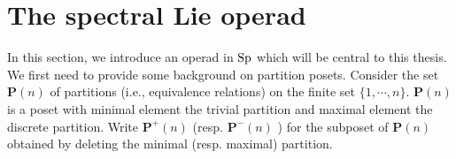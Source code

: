 %
%
%
%
\section{The spectral Lie operad}
\label{The spectral Lie operad}
In this section, we introduce an operad in $\operatorname{Sp}$ which will be central to this thesis. 
We first need to provide some background on partition posets. 
Consider the set $\mathbf{P}(n)$ of partitions (i.e., equivalence relations) on the finite set $\{1, \cdots, n \}$. $\mathbf{P}(n)$ is a poset with minimal element the trivial partition and maximal element the discrete partition.
Write $\mathbf{P}^{+}(n)$ (resp. $\mathbf{P}^{-}(n)$ ) for the subposet of $\mathbf{P}(n)$ obtained by deleting the minimal (resp. maximal) partition.

